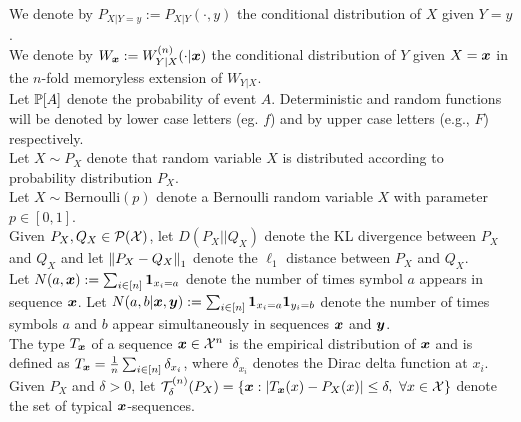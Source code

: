 \\
We denote by $P_{X|Y=y} := P_{X|Y}(\cdot ,y)$ the conditional distribution of $X$ given $Y=y$.
\\
We denote by $W_{\boldsymbol{x}} := W_{Y|X}^{(n)}(\cdot|\boldsymbol{x})$ the conditional distribution of $Y$ given $X=\boldsymbol{x}$ in the $n$-fold memoryless extension of $W_{Y|X}$.
\\
Let $\mathbb{P}[A]$ denote the probability of event $A$. Deterministic and random functions will be denoted by lower case letters (eg. $f$) and by upper case letters (e.g., $F$) respectively. 
\\
Let $X \sim P_X$ denote that random variable $X$ is distributed according to probability distribution $P_X$.
\\
Let $X\sim \text{Bernoulli}(p)$ denote a Bernoulli random variable $X$ with parameter $p\in[0,1]$. 
\\
Given $P_X,Q_X \in \mathcal{P}(\mathcal{X})$, let $D(P_X||Q_X)$ denote the KL divergence between $P_X$ and $Q_{X}$ and let $\left\| P_{X}-Q_X \right\|_1$ denote the $\ell_1$ distance between $P_X$ and $Q_{X}$.
%
\\
Let $N(a,\boldsymbol{x}) := \sum_{i\in[n]} \mathbf{1}_{x_i = a}$ denote the number of times symbol $a$ appears in sequence $\boldsymbol{x}$. 
Let $N(a,b|\boldsymbol{x},\boldsymbol{y}) := \sum_{i\in[n]} \mathbf{1}_{x_i = a} \mathbf{1}_{y_i = b}$ denote the number of times symbols $a$ and $b$ appear simultaneously in sequences $\boldsymbol{x}$ and $\boldsymbol{y}$.
\\
The type $T_{\boldsymbol{x}}$ of a sequence $\boldsymbol{x}\in\mathcal{X}^n$ is the empirical distribution of $\boldsymbol{x}$ and is defined as $T_{\boldsymbol{x}} = \frac{1}{n} \sum_{i\in[n]} \delta_{x_i}$, where $\delta_{x_i}$ denotes the Dirac delta function at $x_i$.
\\
Given $P_X$ and $\delta>0$, let $\mathcal{T}^{(n)}_{\delta}(P_X)=\{\boldsymbol{x}: \left|T_{\boldsymbol{x}}(x)-P_{X}(x)\right|\leq \delta, \ \forall x \in \mathcal{X}\}$ denote the set of typical $\boldsymbol{x}$-sequences.
%